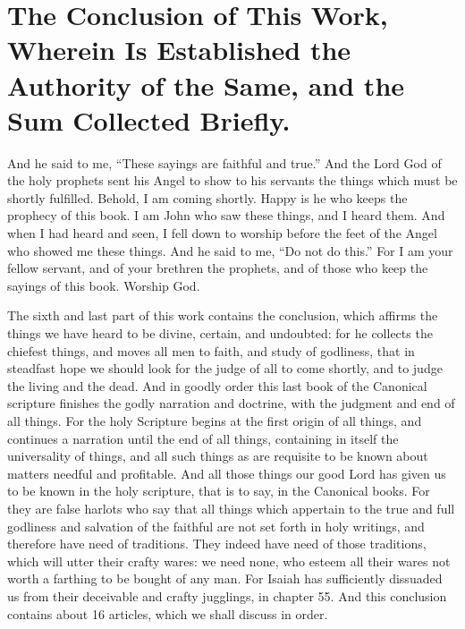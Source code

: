 \chapter[Sermon 97. The Conclusion of This Work, Wherein Is Established the Authority of the Same, and the Sum Collected Briefly.]{The Conclusion of This Work, Wherein Is Established the Authority of the Same, and the Sum Collected Briefly.}
\label{sermon:097}

And he said to me, “These sayings are faithful and true.” And the Lord God of the holy prophets sent his Angel to show to his servants the things which must be shortly fulfilled. Behold, I am coming shortly. Happy is he who keeps the prophecy of this book. I am John who saw these things, and I heard them. And when I had heard and seen, I fell down to worship before the feet of the Angel who showed me these things. And he said to me, “Do not do this.” For I am your fellow servant, and of your brethren the prophets, and of those who keep the sayings of this book. Worship God.

The sixth and last part of this work contains the conclusion, which affirms the things we have heard to be divine, certain, and undoubted: for he collects the chiefest things, and moves all men to faith, and study of godliness, that in steadfast hope we should look for the judge of all to come shortly, and to judge the living and the dead. And in goodly order this last book of the Canonical scripture finishes the godly narration and doctrine, with the judgment and end of all things. For the holy Scripture begins at the first origin of all things, and continues a narration until the end of all things, containing in itself the universality of things, and all such things as are requisite to be known about matters needful and profitable. And all those things our good Lord has given us to be known in the holy scripture, that is to say, in the Canonical books. For they are false harlots who say that all things which appertain to the true and full godliness and salvation of the faithful are not set forth in holy writings, and therefore have need of traditions. They indeed have need of those traditions, which will utter their crafty wares: we need none, who esteem all their wares not worth a farthing to be bought of any man. For Isaiah has sufficiently dissuaded us from their deceivable and crafty jugglings, in chapter 55. And this conclusion contains about 16 articles, which we shall discuss in order.

